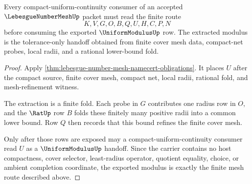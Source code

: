 \begin{theorem}
\label{thm:lebesgue-number-mesh-uniform-modulus-extraction}
Every compact-uniform-continuity consumer of an accepted $\LebesgueNumberMeshUp$ packet must read the finite route
$$
K,V,G,O,B,Q,U,H,C,P,N
$$
before consuming the exported $\UniformModulusUp$ row. The extracted modulus is the tolerance-only handoff obtained from finite cover mesh data, compact-net probes, local radii, and a rational lower-bound fold.
\end{theorem}
\begin{proof}
Apply \autoref{thm:lebesgue-number-mesh-namecert-obligations}. It places $U$ after the compact source, finite cover mesh, compact net, local radii, rational fold, and mesh-refinement witness.

The extraction is a finite fold. Each probe in $G$ contributes one radius row in $O$, and the $\RatUp$ row $B$ folds these finitely many positive radii into a common lower bound. Row $Q$ then records that this bound refines the finite cover mesh.

Only after those rows are exposed may a compact-uniform-continuity consumer read $U$ as a $\UniformModulusUp$ handoff. Since the carrier contains no host compactness, cover selector, least-radius operator, quotient equality, choice, or ambient completion coordinate, the exported modulus is exactly the finite mesh route described above.
\end{proof}



